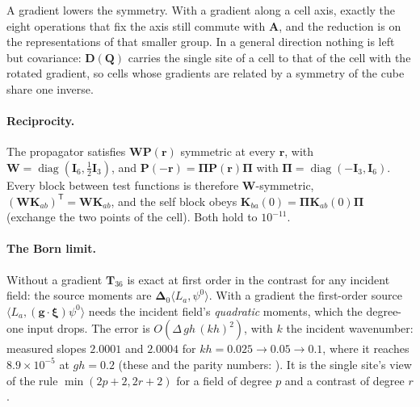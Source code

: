 \documentclass[11pt,a4paper]{article}
\newcommand{\bI}{\mathbf{I}}
\newcommand{\bK}{\mathbf{K}}
\newcommand{\bP}{\mathbf{P}}
\newcommand{\bT}{\mathbf{T}}
\newcommand{\bW}{\mathbf{W}}
\newcommand{\bD}{\boldsymbol{\Delta}}
\begin{document}
A gradient lowers the symmetry. With a gradient along a cell axis, exactly the eight operations that fix
the axis still commute with $\mathbf{A}$, and the reduction is on the representations of that smaller
group. In a general direction nothing is left but covariance: $\mathbf{D}(\mathbf{Q})$ carries the
single site of a cell to that of the cell with the rotated gradient, so cells whose gradients are related
by a symmetry of the cube share one inverse.

\paragraph{Reciprocity.} The propagator satisfies $\bW\bP(\mathbf{r})$ symmetric at every
$\mathbf{r}$, with $\bW=\operatorname{diag}(\bI_6,\tfrac12\bI_3)$, and
$\bP(-\mathbf{r})=\boldsymbol{\Pi}\bP(\mathbf{r})\boldsymbol{\Pi}$ with
$\boldsymbol{\Pi}=\operatorname{diag}(-\bI_3,\bI_6)$. Every block between test functions is therefore
$\bW$-symmetric, $(\bW\bK_{ab})^{\mathsf T}=\bW\bK_{ab}$, and the self block obeys
$\bK_{ba}(0)=\boldsymbol{\Pi}\bK_{ab}(0)\boldsymbol{\Pi}$ (exchange the two points of the cell). Both hold
to $10^{-11}$.

\paragraph{The Born limit.} Without a gradient $\bT_{36}$ is exact at first order in the contrast for any
incident field: the source moments are $\bD_0\langle L_a,\psi^0\rangle$. With a gradient the first-order
source $\langle L_a,(\mathbf{g}\cdot\boldsymbol{\xi})\psi^0\rangle$ needs the incident field's
\emph{quadratic} moments, which the degree-one input drops. The error is $O(\Delta\,gh\,(kh)^2)$, with $k$
the incident wavenumber: measured slopes $2.0001$ and $2.0004$ for $kh=0.025\to0.05\to0.1$, where it
reaches $8.9\times10^{-5}$ at $gh=0.2$ (these and the parity numbers: ).
It is the single site's view of the rule
$\min(2p+2,2r+2)$ for a field of degree $p$ and a contrast of degree $r$ \citep{NestorError2026}.
\end{document}

